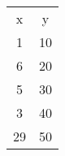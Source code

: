 \begin{table}
\begin{tabular}{cc}
x & y \\
1 & 10 \\
6 & 20 \\
5 & 30 \\
3 & 40 \\
29 & 50 \\
\end{tabular}
\end{table}

